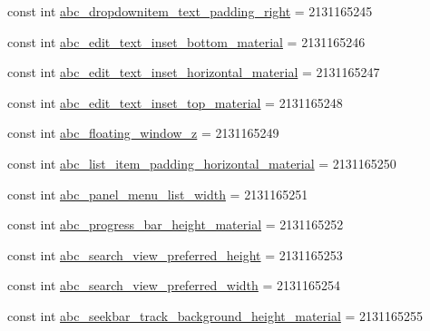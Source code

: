 \begin{DoxyCompactItemize}
const int \mbox{\hyperlink{class_f_w_p_s___app_1_1_droid_1_1_resource_1_1_dimension_a7a1d7a795e00419e939861179cb5f8ff}{abc\+\_\+dropdownitem\+\_\+text\+\_\+padding\+\_\+right}} = 2131165245
\item 
const int \mbox{\hyperlink{class_f_w_p_s___app_1_1_droid_1_1_resource_1_1_dimension_a1bdb2dfb65d43e62ff3503070746a650}{abc\+\_\+edit\+\_\+text\+\_\+inset\+\_\+bottom\+\_\+material}} = 2131165246
\item 
const int \mbox{\hyperlink{class_f_w_p_s___app_1_1_droid_1_1_resource_1_1_dimension_a3f7d750badfb6149c30f3e900cd14415}{abc\+\_\+edit\+\_\+text\+\_\+inset\+\_\+horizontal\+\_\+material}} = 2131165247
\item 
const int \mbox{\hyperlink{class_f_w_p_s___app_1_1_droid_1_1_resource_1_1_dimension_a6a85766bb2ff6666fc041dfda4d677c3}{abc\+\_\+edit\+\_\+text\+\_\+inset\+\_\+top\+\_\+material}} = 2131165248
\item 
const int \mbox{\hyperlink{class_f_w_p_s___app_1_1_droid_1_1_resource_1_1_dimension_acf7b7497794297f5f9d40520f6193b64}{abc\+\_\+floating\+\_\+window\+\_\+z}} = 2131165249
\item 
const int \mbox{\hyperlink{class_f_w_p_s___app_1_1_droid_1_1_resource_1_1_dimension_aab597c5d33073873c838af39c84dfdd3}{abc\+\_\+list\+\_\+item\+\_\+padding\+\_\+horizontal\+\_\+material}} = 2131165250
\item 
const int \mbox{\hyperlink{class_f_w_p_s___app_1_1_droid_1_1_resource_1_1_dimension_a5637a7f979616884993a947e0e6841d4}{abc\+\_\+panel\+\_\+menu\+\_\+list\+\_\+width}} = 2131165251
\item 
const int \mbox{\hyperlink{class_f_w_p_s___app_1_1_droid_1_1_resource_1_1_dimension_a990db7a4ee4daebb903f02453145b3fd}{abc\+\_\+progress\+\_\+bar\+\_\+height\+\_\+material}} = 2131165252
\item 
const int \mbox{\hyperlink{class_f_w_p_s___app_1_1_droid_1_1_resource_1_1_dimension_ad3731e70c752e94e19612f1ddb5dce86}{abc\+\_\+search\+\_\+view\+\_\+preferred\+\_\+height}} = 2131165253
\item 
const int \mbox{\hyperlink{class_f_w_p_s___app_1_1_droid_1_1_resource_1_1_dimension_a18fd1079fa710c6a961ecf616326a113}{abc\+\_\+search\+\_\+view\+\_\+preferred\+\_\+width}} = 2131165254
\item 
const int \mbox{\hyperlink{class_f_w_p_s___app_1_1_droid_1_1_resource_1_1_dimension_a56d7d053ecd867a474f878a085413d65}{abc\+\_\+seekbar\+\_\+track\+\_\+background\+\_\+height\+\_\+material}} = 2131165255
\item 

\end{DoxyCompactItemize}
